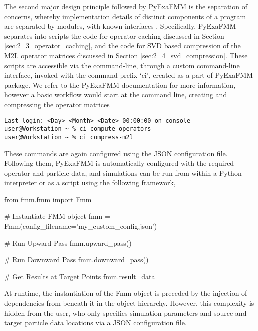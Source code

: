 The second major design principle followed by \gls{PyExaFMM} is
the separation of concerns, whereby implementation details of distinct
components of a program are separated by modules, with known interfaces
\cite{Gamma:1994:Addison}. Specifically, \gls{PyExaFMM} separates into scripts
the code for operator caching discussed in Section \ref{sec:2_3_operator_caching},
and the code for SVD based compression of the M2L operator matrices discussed in
Section \ref{sec:2_4_svd_compression}. These scripts are accessible via the
command-line, through a custom command-line interface, invoked with the command
prefix `ci', created as a part of \gls{PyExaFMM} package. We refer to the \gls{PyExaFMM} documentation for more information,
however a basic workflow would start at the command line, creating and compressing
the operator matrices

\begin{verbatim}
Last login: <Day> <Month> <Date> 00:00:00 on console
user@Workstation ~ % ci compute-operators
user@Workstation ~ % ci compress-m2l
\end{verbatim}

These commands are again configured using the \gls{JSON} configuration file.
Following them, \gls{PyExaFMM} is automatically configured with the required
operator and particle data, and simulations can be run from within a Python
interpreter or as a script using the following framework,

\begin{python}
from fmm.fmm import Fmm

# Instantiate FMM object
fmm = Fmm(config_filename='my_custom_config.json')

# Run Upward Pass
fmm.upward_pass()

# Run Downward Pass
fmm.downward_pass()

# Get Results at Target Points
fmm.result_data
\end{python}

At runtime, the instantiation of the Fmm object is preceded by the injection of
dependencies from beneath it in the object hierarchy. However, this complexity is
hidden from the user, who only specifies simulation parameters and source
and target particle data locations via a \gls{JSON} configuration file.

